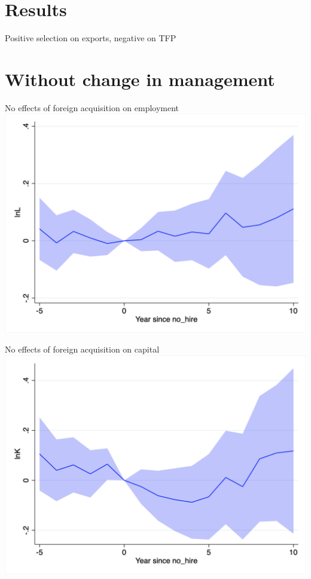 \documentclass[
  ignorenonframetext,
  aspectratio=43,
]{beamer}
\begin{document}
\hypertarget{results}{%
\section{Results}\label{results}}

\begin{frame}{Positive selection on exports, negative on TFP}
\protect\hypertarget{positive-selection-on-exports-negative-on-tfp}{}

\end{frame}

\hypertarget{without-change-in-management}{%
\section{Without change in
management}\label{without-change-in-management}}

\begin{frame}{No effects of foreign acquisition on employment}
\protect\hypertarget{no-effects-of-foreign-acquisition-on-employment}{}
\includegraphics{figure/event_study/no_hire_lnL.png}
\end{frame}

\begin{frame}{No effects of foreign acquisition on capital}
\protect\hypertarget{no-effects-of-foreign-acquisition-on-capital}{}
\includegraphics{figure/event_study/no_hire_lnK.png}
\end{frame}
\end{document}
